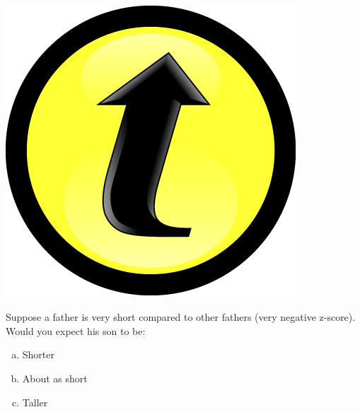 \documentclass[handout]{beamer}
\begin{document}
\begin{frame}
\frametitle{\includegraphics[scale = 0.05]{./images/clicker}}

Suppose a father is very short compared to other fathers (very negative z-score). Would you expect his son to be:
	\begin{enumerate}[(a)]
\item Shorter
\item About as short
\item Taller
\end{enumerate}
\end{frame}

\begin{frame}



\end{frame}
\end{document}
